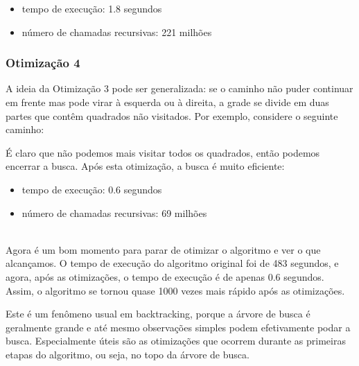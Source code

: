 \begin{itemize}
\item
tempo de execução: 1.8 segundos
\item
número de chamadas recursivas: 221 milhões
\end{itemize}

\subsubsection{Otimização 4}

A ideia da Otimização 3
pode ser generalizada:
se o caminho não puder continuar em frente
mas pode virar à esquerda ou à direita,
a grade se divide em duas partes
que contêm quadrados não visitados.
Por exemplo, considere o seguinte caminho:

\begin{center}
\end{center}
É claro que não podemos mais visitar todos os quadrados,
então podemos encerrar a busca.
Após esta otimização, a busca é
muito eficiente:

\begin{itemize}
\item
tempo de execução: 0.6 segundos
\item
número de chamadas recursivas: 69 milhões
\end{itemize}

~\\
Agora é um bom momento para parar de otimizar
o algoritmo e ver o que alcançamos.
O tempo de execução do algoritmo original
foi de 483 segundos,
e agora, após as otimizações,
o tempo de execução é de apenas 0.6 segundos.
Assim, o algoritmo se tornou quase 1000 vezes
mais rápido após as otimizações.

Este é um fenômeno usual em backtracking,
porque a árvore de busca é geralmente grande
e até mesmo observações simples podem efetivamente
podar a busca.
Especialmente úteis são as otimizações que
ocorrem durante as primeiras etapas do algoritmo,
ou seja, no topo da árvore de busca.

